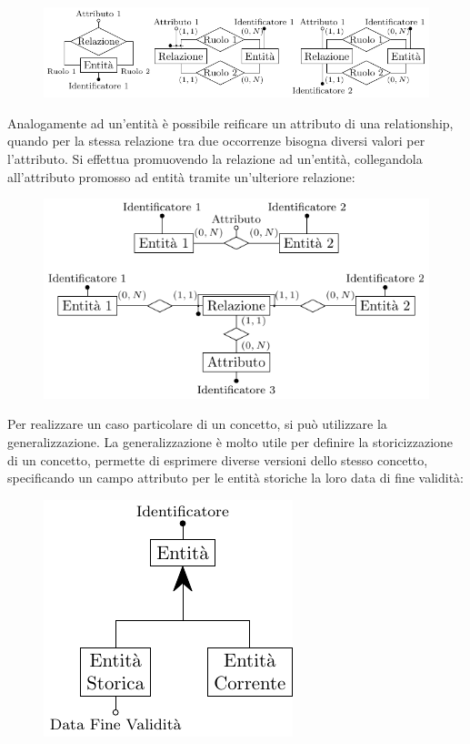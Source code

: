 \documentclass{article}
\numberwithin{equation}{subsection}
\begin{document}
\begin{figure}[H]%
    \centering%
    \includegraphics[trim={0.4cm 0 0 0},scale=1.2]{reificazione_relationship_ricorsiva.pdf}%
\end{figure}

Analogamente ad un'entità è possibile reificare un attributo di una relationship, 
quando per la stessa relazione tra due occorrenze bisogna diversi valori 
per l'attributo. Si effettua promuovendo la relazione ad un'entità, collegandola 
all'attributo promosso ad entità tramite un'ulteriore relazione:
\begin{figure}[H]%
    \centering%
    \includegraphics[scale=1.25]{reificazione_attributo_relationship.pdf}%
\end{figure}

Per realizzare un caso particolare di un concetto, si può utilizzare la generalizzazione. La 
generalizzazione è molto utile per definire la storicizzazione di un concetto, permette 
di esprimere diverse versioni dello stesso concetto, specificando un campo attributo per 
le entità storiche la loro data di fine validità:

\begin{figure}[H]%
    \centering%
    \includegraphics[scale=1.25]{storicizzazione_concetto.pdf}%
\end{figure}
\end{document}
